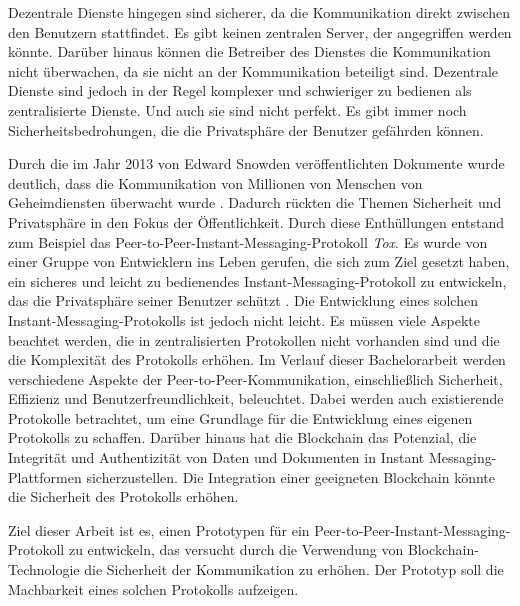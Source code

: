 Dezentrale Dienste hingegen sind sicherer, da die Kommunikation direkt zwischen den Benutzern stattfindet. Es gibt keinen zentralen Server, der angegriffen werden könnte. Darüber hinaus können die Betreiber des Dienstes die Kommunikation nicht überwachen, da sie nicht an der Kommunikation beteiligt sind. Dezentrale Dienste sind jedoch in der Regel komplexer und schwieriger zu bedienen als zentralisierte Dienste. Und auch sie sind nicht perfekt. Es gibt immer noch Sicherheitsbedrohungen, die die Privatsphäre der Benutzer gefährden können.

Durch die im Jahr 2013 von Edward Snowden veröffentlichten Dokumente wurde deutlich, dass die Kommunikation von Millionen von Menschen von Geheimdiensten überwacht wurde \parencite{greenwald_NSA}. Dadurch rückten die Themen Sicherheit und Privatsphäre in den Fokus der Öffentlichkeit. Durch diese Enthüllungen entstand zum Beispiel das Peer-to-Peer-Instant-Messaging-Protokoll \textit{Tox}. Es wurde von einer Gruppe von Entwicklern ins Leben gerufen, die sich zum Ziel gesetzt haben, ein sicheres und leicht zu bedienendes Instant-Messaging-Protokoll zu entwickeln, das die Privatsphäre seiner Benutzer schützt \parencite{tox_about}. Die Entwicklung eines solchen Instant-Messaging-Protokolls ist jedoch nicht leicht. Es müssen viele Aspekte beachtet werden, die in zentralisierten Protokollen nicht vorhanden sind und die die Komplexität des Protokolls erhöhen. Im Verlauf dieser Bachelorarbeit werden verschiedene Aspekte der Peer-to-Peer-Kommunikation, einschließlich Sicherheit, Effizienz und Benutzerfreundlichkeit, beleuchtet. Dabei werden auch existierende Protokolle betrachtet, um eine Grundlage für die Entwicklung eines eigenen Protokolls zu schaffen. Darüber hinaus hat die Blockchain das Potenzial, die Integrität und Authentizität von Daten und Dokumenten in Instant Messaging-Plattformen sicherzustellen. Die Integration einer geeigneten Blockchain könnte die Sicherheit des Protokolls erhöhen.

Ziel dieser Arbeit ist es, einen Prototypen für ein Peer-to-Peer-Instant-Messaging-Protokoll zu entwickeln, das versucht durch die Verwendung von Blockchain-Technologie die Sicherheit der Kommunikation zu erhöhen. Der Prototyp soll die Machbarkeit eines solchen Protokolls aufzeigen. 
